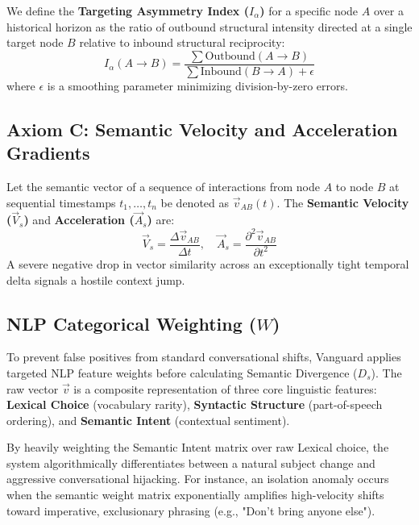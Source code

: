 We define the \textbf{Targeting Asymmetry Index ($I_\alpha$)} for a specific node $A$ over a historical horizon as the ratio of outbound structural intensity directed at a single target node $B$ relative to inbound structural reciprocity:
\begin{equation}
I_\alpha(A \to B) = \frac{\sum \text{Outbound}(A \to B)}{\sum \text{Inbound}(B \to A) + \epsilon}
\end{equation}
where $\epsilon$ is a smoothing parameter minimizing division-by-zero errors.

\subsection{Axiom C: Semantic Velocity and Acceleration Gradients}
Let the semantic vector of a sequence of interactions from node $A$ to node $B$ at sequential timestamps $t_1, \dots, t_n$ be denoted as $\vec{v}_{AB}(t)$. The \textbf{Semantic Velocity ($\vec{V}_s$)} and \textbf{Acceleration ($\vec{A}_s$)} are:
\begin{equation}
\vec{V}_s = \frac{\Delta \vec{v}_{AB}}{\Delta t}, \quad \vec{A}_s = \frac{\partial^2 \vec{v}_{AB}}{\partial t^2}
\end{equation}
A severe negative drop in vector similarity across an exceptionally tight temporal delta signals a hostile context jump.

\subsection{NLP Categorical Weighting ($W$)}
To prevent false positives from standard conversational shifts, Vanguard applies targeted NLP feature weights before calculating Semantic Divergence ($D_s$). The raw vector $\vec{v}$ is a composite representation of three core linguistic features: \textbf{Lexical Choice} (vocabulary rarity), \textbf{Syntactic Structure} (part-of-speech ordering), and \textbf{Semantic Intent} (contextual sentiment).

By heavily weighting the Semantic Intent matrix over raw Lexical choice, the system algorithmically differentiates between a natural subject change and aggressive conversational hijacking. For instance, an isolation anomaly occurs when the semantic weight matrix exponentially amplifies high-velocity shifts toward imperative, exclusionary phrasing (e.g., "Don't bring anyone else").
